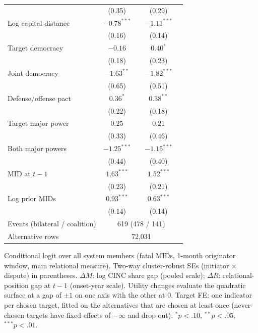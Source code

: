 \begin{table}[!htbp]
\begin{tabular}{lcccc}
 & (0.35) &  & (0.29) &  \\
Log capital distance & $-0.78^{***}$ &  & $-1.11^{***}$ &  \\
 & (0.16) &  & (0.14) &  \\
Target democracy & $-0.16$ &  & $0.40^{*}$ &  \\
 & (0.18) &  & (0.23) &  \\
Joint democracy & $-1.63^{**}$ &  & $-1.82^{***}$ &  \\
 & (0.65) &  & (0.51) &  \\
Defense/offense pact & $0.36^{*}$ &  & $0.38^{**}$ &  \\
 & (0.22) &  & (0.18) &  \\
Target major power & $0.25$ &  & $0.21$ &  \\
 & (0.33) &  & (0.46) &  \\
Both major powers & $-1.25^{***}$ &  & $-1.15^{***}$ &  \\
 & (0.44) &  & (0.40) &  \\
MID at $t-1$ & $1.63^{***}$ &  & $1.52^{***}$ &  \\
 & (0.23) &  & (0.21) &  \\
Log prior MIDs & $0.93^{***}$ &  & $0.63^{***}$ &  \\
 & (0.14) &  & (0.14) &  \\
\midrule
Events (bilateral / coalition) & \multicolumn{4}{c}{619 (478 / 141)} \\
Alternative rows & \multicolumn{4}{c}{72,031} \\
\bottomrule
\end{tabular}
\begin{minipage}{0.95\linewidth}\footnotesize\smallskip Conditional logit over all system members (fatal MIDs, 1-month originator window, main relational measure). Two-way cluster-robust SEs (initiator $\times$ dispute) in parentheses. $\Delta M$: log CINC share gap (pooled scale); $\Delta R$: relational-position gap at $t-1$ (onset-year scale). Utility changes evaluate the quadratic surface at a gap of $\pm 1$ on one axis with the other at 0. Target FE: one indicator per chosen target, fitted on the alternatives that are chosen at least once (never-chosen targets have fixed effects of $-\infty$ and drop out). $^{*}p<.10$, $^{**}p<.05$, $^{***}p<.01$.\end{minipage}
\end{table}

